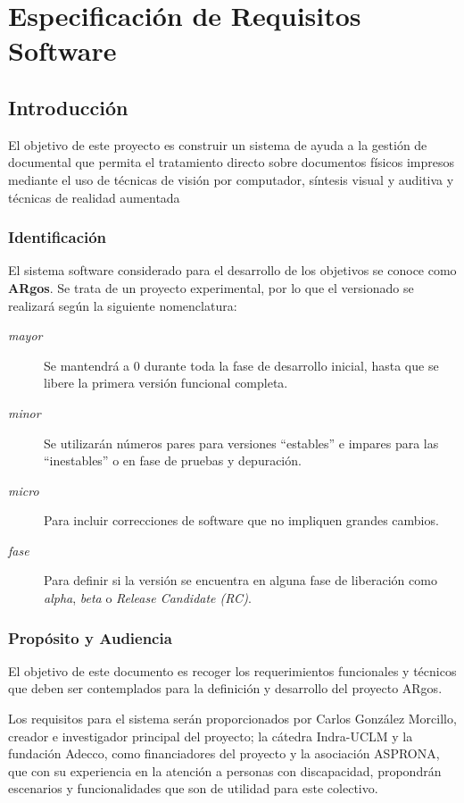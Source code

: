 \chapter{Especificación de Requisitos Software}

\section{Introducción}
El objetivo de este proyecto es construir un sistema de ayuda a la gestión de documental que permita el tratamiento directo sobre documentos físicos impresos mediante el
uso de técnicas de visión por computador, síntesis visual y auditiva y técnicas de realidad aumentada

\subsection{Identificación}
El sistema software considerado para el desarrollo de los objetivos se conoce como \textbf{ARgos}. Se trata de un proyecto experimental, por lo que el versionado se realizará según la siguiente nomenclatura:
\begin{description}
\item[\textit{mayor}] Se mantendrá a 0 durante toda la fase de desarrollo inicial, hasta que se libere la primera versión funcional completa.
\item[\textit{minor}] Se utilizarán números pares para versiones ``estables'' e impares para las ``inestables'' o en fase de pruebas y depuración.
\item[\textit{micro}] Para incluir correcciones de software que no impliquen grandes cambios.
\item[\textit{fase}] Para definir si la versión se encuentra en alguna fase de liberación como \textit{alpha}, \textit{beta} o \textit{Release Candidate (RC)}. 
\end{description}
 \subsection{Propósito y Audiencia}

El objetivo de este documento es recoger los requerimientos funcionales y técnicos que deben ser contemplados para la definición y desarrollo del proyecto ARgos. 

Los requisitos para el sistema serán proporcionados por Carlos González Morcillo, creador e investigador principal del proyecto; la cátedra Indra-UCLM y la fundación Adecco, como financiadores del proyecto y la asociación ASPRONA, que con su experiencia en la atención a personas con discapacidad, propondrán escenarios y funcionalidades que son de utilidad para este colectivo. 

